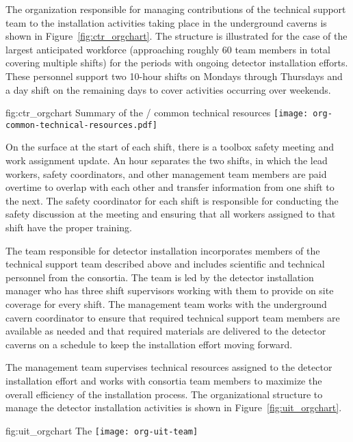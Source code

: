 The organization responsible for managing contributions of 
the technical support team to the installation 
activities taking place in the underground caverns is shown 
in Figure~\ref{fig:ctr_orgchart}.  The structure is illustrated
for the case of the largest anticipated workforce (approaching 
roughly 60 team members in total covering multiple shifts) 
for the periods with ongoing detector installation efforts.
These personnel support two 10-hour shifts on Mondays through 
Thursdays and a day shift on the remaining days to cover 
activities occurring over weekends. 
\begin{dunefigure}{fig:ctr_orgchart}
  {Summary of the / common technical resources}
  \texttt{[image: org-common-technical-resources.pdf]}
\end{dunefigure}

On the surface at the start of each shift, there is a toolbox safety
meeting and work assignment update. An hour separates the two shifts,
in which the lead workers, safety coordinators, and other management
team members are paid overtime to overlap with each other and
transfer information from one shift to the next. The safety
coordinator for each shift is responsible for conducting the safety
discussion at the meeting and ensuring that all workers assigned to
that shift have the proper training.

The team responsible for detector installation incorporates 
members of the technical support team described above 
and includes scientific and technical personnel from 
the  consortia.  The team is led by the detector
installation manager who has three shift supervisors working 
with them to provide on site coverage for every shift.
The management team works with the underground cavern
coordinator to ensure that required technical support team 
members are available as needed and that required materials 
are delivered to the detector caverns on a schedule to keep
the installation effort moving forward.         

The management team supervises technical resources assigned to 
the detector installation effort and works with consortia 
team members to maximize the overall efficiency of the installation 
process.  The organizational structure to manage the detector 
installation activities is shown in Figure~\ref{fig:uit_orgchart}.
\begin{dunefigure}{fig:uit_orgchart}
  {The }
  \texttt{[image: org-uit-team]}
\end{dunefigure}

